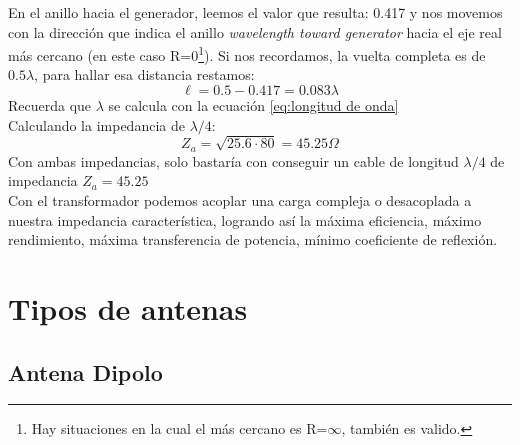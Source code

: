 \documentclass[
	12pt, %
	fleqn, %
	a4paper, %
	oneside, %
]{LegrandOrangeBook}
\begin{document}
\begin{example}[Se tiene una $Z_L=32-\iu 40$ con una impedancia característica de $80\Omega$. Diseñe la adaptación por $\lambda/4$.]
\begin{center}
\end{center}
En el anillo hacia el generador, leemos el valor que resulta: 0.417 y nos movemos con la dirección que indica el anillo \textit{wavelength toward generator} hacia el eje real más cercano (en este caso R=0\footnote{Hay situaciones en la cual el más cercano es R=$\infty$, también es valido.}). Si nos recordamos, la vuelta completa es de $0.5\lambda$, para hallar esa distancia restamos:
\begin{displaymath}
\ell=0.5-0.417=0.083\lambda
\end{displaymath}
Recuerda que $\lambda$ se calcula con la ecuación \ref{eq:longitud de onda}\\
Calculando la impedancia de $\lambda/4$:
\begin{displaymath}
Z_a=\sqrt{25.6\cdot 80}=45.25\Omega
\end{displaymath}
Con ambas impedancias, solo bastaría con conseguir un cable de longitud $\lambda/4$ de impedancia $Z_a=45.25$\\
Con el transformador podemos acoplar una carga compleja o desacoplada a nuestra impedancia característica, logrando así la máxima eficiencia, máximo rendimiento, máxima transferencia de potencia, mínimo coeficiente de reflexión.
\end{example}
\chapter{Tipos de antenas}
\section{Antena Dipolo}
\end{document}
